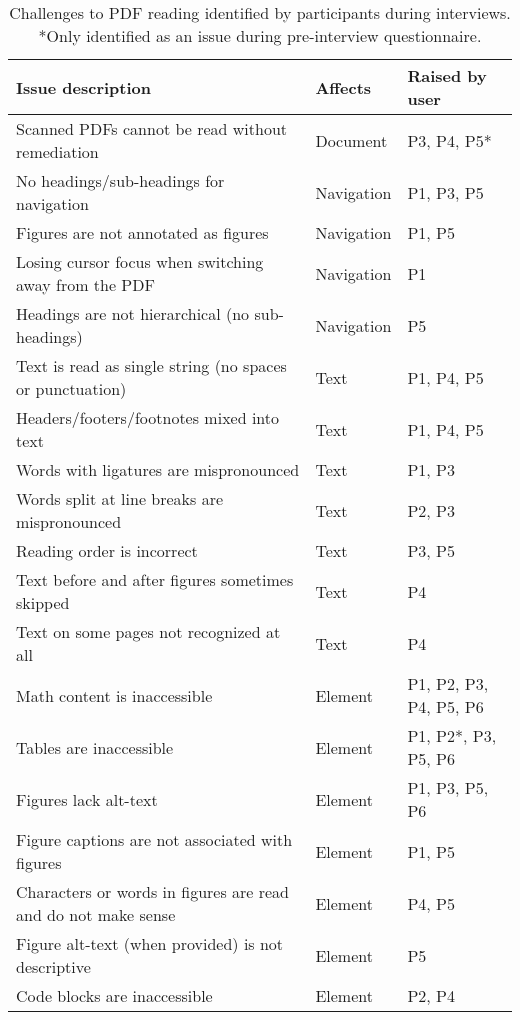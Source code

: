 \begin{table}[t!]
    \centering
    \begin{tabular}{lll}
        \toprule
        \textbf{Issue description} & \textbf{Affects} & \textbf{Raised by user} \\
        \midrule
        Scanned PDFs cannot be read without remediation & Document & P3, P4, P5* \\
        \midrule
        No headings/sub-headings for navigation & Navigation & P1, P3, P5 \\
        Figures are not annotated as figures & Navigation & P1, P5 \\
        Losing cursor focus when switching away from the PDF & Navigation & P1 \\
        Headings are not hierarchical (no sub-headings) & Navigation & P5 \\
        \midrule
        Text is read as single string (no spaces or punctuation) & Text & P1, P4, P5 \\
        Headers/footers/footnotes mixed into text & Text & P1, P4, P5 \\
        Words with ligatures are mispronounced & Text & P1, P3 \\
        Words split at line breaks are mispronounced & Text & P2, P3 \\
        Reading order is incorrect & Text & P3, P5 \\
        Text before and after figures sometimes skipped & Text & P4 \\
        Text on some pages not recognized at all & Text & P4 \\
        \midrule
        Math content is inaccessible & Element & P1, P2, P3, P4, P5, P6 \\
        Tables are inaccessible & Element & P1, P2*, P3, P5, P6 \\
        Figures lack alt-text & Element & P1, P3, P5, P6 \\
        Figure captions are not associated with figures & Element & P1, P5 \\
        Characters or words in figures are read and do not make sense & Element & P4, P5 \\
        Figure alt-text (when provided) is not descriptive & Element & P5 \\
        Code blocks are inaccessible & Element & P2, P4 \\
        \bottomrule
    \end{tabular}
    \caption{Challenges to PDF reading identified by participants during interviews. *Only identified as an issue during pre-interview questionnaire.}

\end{table}
